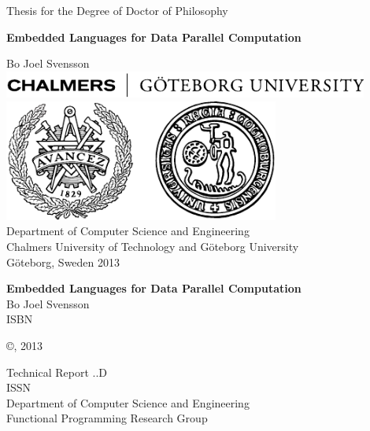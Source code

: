 \documentclass[a4paper]{book}
\newcommand{\thesistitle}{Embedded Languages for Data Parallel Computation}
\newcommand{\dept}{Department of Computer Science and Engineering}
\newcommand{\uni}{Chalmers University of Technology and G\"oteborg University}
\newcommand{\group}{Functional Programming Research Group}
\begin{document}
\begin{titlepage}
\begin{centering}
{\sc Thesis for the Degree of Doctor of Philosophy}
\vspace{30ex}

{\LARGE\bf\thesistitle}

\vspace{7ex}

\large Bo Joel Svensson
\vfill
\includegraphics[width=120mm]{./img/ChalmGUtextsvEng}\\[5mm]
\includegraphics[height=4cm]{./img/ChalmGUmarke}\\

\vspace{1cm}
\normalsize
{\sc \dept}\\
{\sc \uni}\\
G\"oteborg, Sweden 2013

\end{centering}
\end{titlepage}


\quad \vfill

{\noindent\large\bf\thesistitle} \\
\noindent Bo Joel Svensson \\
\noindent ISBN \\

\vspace{1cm}

\noindent\copyright {}, 2013 \\ 
\vspace{1cm} 

\noindent Technical Report ..D\\
\noindent ISSN                \\
\noindent \dept \\
\noindent \group\\
\end{document}
